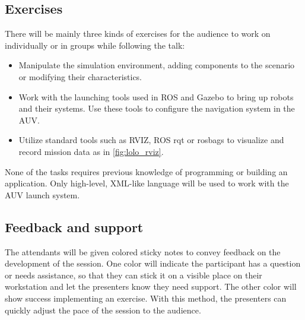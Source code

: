 \documentclass[
10pt, %
a4paper, %
oneside, %
headinclude,footinclude, %
BCOR5mm, %
]{scrartcl}
\begin{document}
\subsection{\textbf{Exercises}}
There will be mainly three kinds of exercises for the audience to work on individually or in groups while following the talk:

\begin{itemize}
	\item Manipulate the simulation environment, adding components to the scenario or modifying their characteristics.
	\item Work with the launching tools used in ROS and Gazebo to bring up robots and their systems. 
	Use these tools to configure the navigation system in the AUV.
	\item Utilize standard tools such as RVIZ, ROS rqt or rosbags to visualize and record mission data as in \ref{fig:lolo_rviz}.
\end{itemize}

None of the tasks requires previous knowledge of programming or building an application.
Only high-level, XML-like language will be used to work with the AUV launch system.

\subsection{\textbf{Feedback and support}}
The attendants will be given colored sticky notes to convey feedback on the development of the session. 
One color will indicate the participant has a question or needs assistance, so that they can stick it on a visible place on their workstation and let the presenters know they need support.
The other color will show success implementing an exercise.
With this method, the presenters can quickly adjust the pace of the session to the audience.



\end{document}

